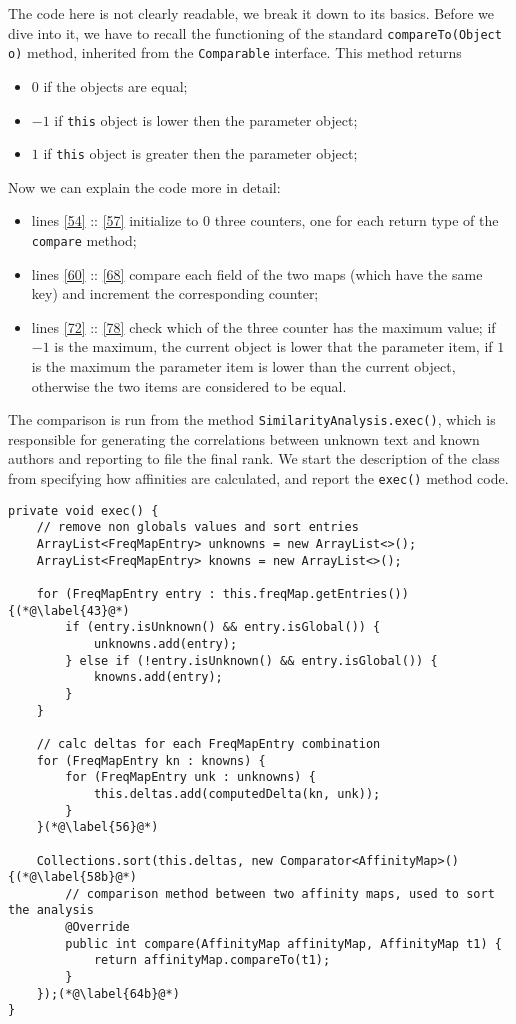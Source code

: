 \documentclass[a4paper,11pt, twoside]{article}
\begin{document}
	 The code here is not clearly readable, we break it down to its basics. Before we dive into it, we have to recall the functioning of the standard \lstinline|compareTo(Object o)| method, inherited from the \lstinline|Comparable| interface. This method returns \begin{itemize}
	 	\item $0$ if the objects are equal;
	 	\item $-1$ if \lstinline|this| object is lower then the parameter object;
	 	\item $1$ if \lstinline|this| object is greater then the parameter object;
	 \end{itemize}
 
 	Now we can explain the code more in detail: \begin{itemize}
 		\item lines \ref{54} :: \ref{57} initialize to 0 three counters, one for each return type of the \lstinline|compare| method;
 		\item lines \ref{60} :: \ref{68} compare each field of the two maps (which have the same key) and increment the corresponding counter;
 		\item lines \ref{72} :: \ref{78} check which of the three counter has the maximum value; if $-1$ is the maximum, the current object is lower that the parameter item, if $1$ is the maximum the parameter item is lower than the current object, otherwise the two items are considered to be equal.
 	\end{itemize}
 	The comparison is run from the method \lstinline|SimilarityAnalysis.exec()|, which is responsible for generating the correlations between unknown text and known authors and reporting to file the final rank. We start the description of the class from specifying how affinities are calculated, and report the \lstinline|exec()| method code.
 	
 	\begin{lstlisting}[firstnumber=38]
private void exec() {
	// remove non globals values and sort entries
	ArrayList<FreqMapEntry> unknowns = new ArrayList<>();
	ArrayList<FreqMapEntry> knowns = new ArrayList<>();
	
	for (FreqMapEntry entry : this.freqMap.getEntries()) {(*@\label{43}@*)
		if (entry.isUnknown() && entry.isGlobal()) {
			unknowns.add(entry);
		} else if (!entry.isUnknown() && entry.isGlobal()) {
			knowns.add(entry);
		}
	}
	
	// calc deltas for each FreqMapEntry combination
	for (FreqMapEntry kn : knowns) {
		for (FreqMapEntry unk : unknowns) {
			this.deltas.add(computedDelta(kn, unk));
		}
	}(*@\label{56}@*)
	
	Collections.sort(this.deltas, new Comparator<AffinityMap>() {(*@\label{58b}@*)
		// comparison method between two affinity maps, used to sort the analysis
		@Override
		public int compare(AffinityMap affinityMap, AffinityMap t1) {
			return affinityMap.compareTo(t1);
		}
	});(*@\label{64b}@*)
}
 	\end{lstlisting}
 	
\end{document}
